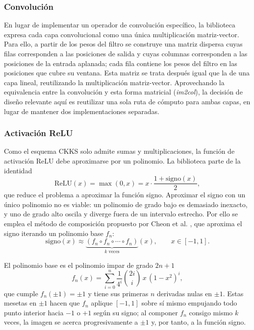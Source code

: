 \subsubsection{Convolución}

En lugar de implementar un operador de convolución específico, la biblioteca expresa cada capa convolucional como una única multiplicación matriz-vector. Para ello, a partir de los pesos del filtro se construye una matriz dispersa cuyas filas corresponden a las posiciones de salida y cuyas columnas corresponden a las posiciones de la entrada aplanada; cada fila contiene los pesos del filtro en las posiciones que cubre su ventana. Esta matriz se trata después igual que la de una capa lineal, reutilizando la multiplicación matriz-vector. Aprovechando la equivalencia entre la convolución y esta forma matricial (\textit{im2col}), la decisión de diseño relevante aquí es reutilizar una sola ruta de cómputo para ambas capas, en lugar de mantener dos implementaciones separadas.

\subsubsection{Activación ReLU}

Como el esquema CKKS solo admite sumas y multiplicaciones, la función de activación ReLU debe aproximarse por un polinomio. La biblioteca parte de la identidad
\begin{equation}
\mathrm{ReLU}(x) = \max(0, x) = x \cdot \frac{1 + \mathrm{signo}(x)}{2},
\label{eq:relu_sign}
\end{equation}
que reduce el problema a aproximar la función signo. Aproximar el signo con un único polinomio no es viable: un polinomio de grado bajo es demasiado inexacto, y uno de grado alto oscila y diverge fuera de un intervalo estrecho. Por ello se emplea el método de composición propuesto por Cheon et al. \cite{CKKL19}, que aproxima el signo iterando un polinomio base $f_n$:
\begin{equation}
\mathrm{signo}(x) \approx \underbrace{(f_n \circ f_n \circ \cdots \circ f_n)}_{k \text{ veces}}(x), \qquad x \in [-1, 1].
\label{eq:sign_composition}
\end{equation}

El polinomio base es el polinomio impar de grado $2n+1$
\begin{equation}
f_n(x) = \sum_{i=0}^{n} \frac{1}{4^{i}} \binom{2i}{i}\, x\,(1 - x^2)^{i},
\label{eq:fn}
\end{equation}
que cumple $f_n(\pm 1) = \pm 1$ y tiene sus primeras $n$ derivadas nulas en $\pm 1$. Estas mesetas en $\pm 1$ hacen que $f_n$ aplique $[-1,1]$ sobre sí mismo empujando todo punto interior hacia $-1$ o $+1$ según su signo; al componer $f_n$ consigo mismo $k$ veces, la imagen se acerca progresivamente a $\pm 1$ y, por tanto, a la función signo. 

